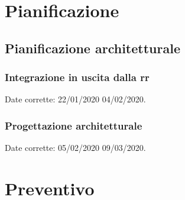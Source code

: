 \documentclass{article}
\begin{document}
\section{Pianificazione}%
\label{sec:pianificazione}
\subsection{Pianificazione architetturale}%
\label{sub:pianificazione_architetturale}
\subsubsection{Integrazione in uscita dalla rr}%
\label{subs:integrazione_in_uscita_dalla_rr}
Date corrette: 22/01/2020  04/02/2020.
\subsubsection{Progettazione architetturale}%
\label{subs:progettazione_architetturale}
Date corrette: 05/02/2020  09/03/2020.
\section{Preventivo}%
\label{sec:preventivo}
\end{document}
